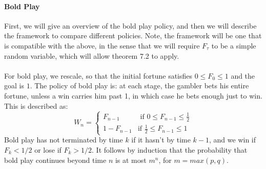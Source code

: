 \documentclass[12pt,a4paper]{article}
\newcommand{\1}[1]{\mathbbm{1}\left\{ #1 \right\}}
\begin{document}
\paragraph{Bold Play} First, we will give an overview of the bold play policy, and then we will describe the framework to compare different policies. Note, the framework will be one that is compatible with the above, in the sense that we will require $F_\tau$ to be a simple random variable, which will allow theorem 7.2 to apply.
\\\\
For bold play, we rescale, so that the initial fortune satisfies $0 \leq F_0 \leq 1$ and the goal is $1$. The policy of bold play is: at each stage, the gambler bets his entire fortune, unless a win carries him past 1, in which case he bets enough just to win. This is described as:
$$
	W_n = 
	\begin{cases}
	F_{n-1} & \text{ if $0 \leq F_{n-1} \leq \frac{1}{2}$}\\
	1 - F_{n-1} & \text{if $\frac{1}{2} \leq F_{n-1} \leq 1$}
	\end{cases}
$$
Bold play has not terminated by time $k$ if it hasn't by time $k-1$, and we win if $F_k < 1/2$ or lose if $F_k > 1/2$. It follows by induction that the probability that bold play continues beyond time $n$ is at most $m^n$, for $m = max(p,q)$. 
\end{document}

